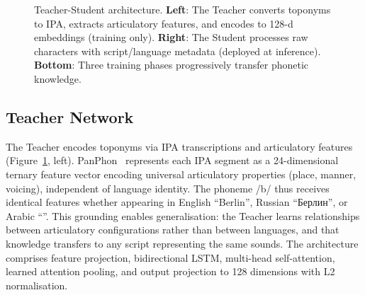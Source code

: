 \documentclass[11pt,a4paper]{article}
\newcommand{\textar}[1]{{\arabicfont\RL{#1}}}
\newcommand{\embdim}{128}
\begin{document}
\begin{figure}[ht]
\caption{Teacher-Student architecture. \textbf{Left}: The Teacher converts toponyms to IPA, extracts articulatory features, and encodes to 128-d embeddings (training only). \textbf{Right}: The Student processes raw characters with script/language metadata (deployed at inference). \textbf{Bottom}: Three training phases progressively transfer phonetic knowledge.}
\label{fig:architecture}
\end{figure}
\subsection{Teacher Network}
\label{subsec:teacher}

The Teacher encodes toponyms via IPA transcriptions and articulatory features (Figure~\ref{fig:architecture}, left). PanPhon~\citep{mortensen2016} represents each IPA segment as a 24-dimensional ternary feature vector encoding universal articulatory properties (place, manner, voicing), independent of language identity. The phoneme /b/ thus receives identical features whether appearing in English ``Berlin'', Russian ``Берлин'', or Arabic ``\textar{برلين}''. This grounding enables generalisation: the Teacher learns relationships between articulatory configurations rather than between languages, and that knowledge transfers to any script representing the same sounds. The architecture comprises feature projection, bidirectional LSTM, multi-head self-attention, learned attention pooling, and output projection to \embdim{} dimensions with L2 normalisation.
\end{document}
